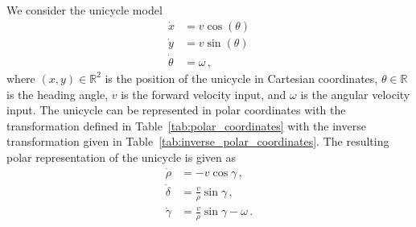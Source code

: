 \documentclass[journal,twoside,web]{ieeecolor}
\theoremstyle{definition}
\newcommand{\R}{\mathbb{R}}
\begin{document}
We consider the unicycle model 
\begin{subequations}
\label{eq:unicycle_cartesian}
\begin{align}
\dot{x} &=  v \cos(\theta)\\
\dot{y} &= v \sin(\theta)  \\
\dot{\theta} &= \omega \,,\label{eq:dot_theta_omega}
\end{align}
\end{subequations}
where $(x,y) \in \R^2$ is the position of the unicycle in Cartesian coordinates, $\theta \in \mathbb{R}$ is the heading angle, $v$ is the forward velocity input, and $\omega$ is the angular velocity input. The unicycle can be represented in polar coordinates with the transformation defined in Table~\ref{tab:polar_coordinates} with the inverse transformation given in Table~\ref{tab:inverse_polar_coordinates}. The resulting polar representation of the unicycle  is given as 
\begin{subequations}\label{eq:unicycle_polar_closed_loop-Gv-1}
    \begin{align}
    \dot{\rho} &= 
    -v \cos\gamma\label{eq:unicycle_polar_rhodot}\,,\\
    \dot{\delta} &= \frac{v}{\rho}  \sin\gamma\label{eq:unicycle_polar_deltadot}\,,\\
    \dot{\gamma} &= \frac{v}{\rho} \sin\gamma -\omega \label{eq:unicycle_polar_gammadot} \,.
    \end{align} 
\end{subequations}

\end{document}
